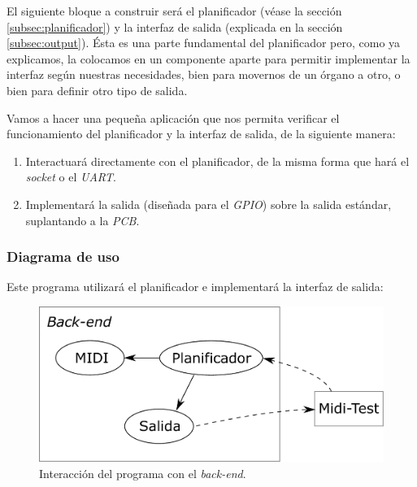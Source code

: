 El siguiente bloque a construir será el planificador (véase la sección \ref{subsec:planificador}) y la interfaz de salida (explicada en la sección \ref{subsec:output}). Ésta es una parte fundamental del planificador pero, como ya explicamos, la colocamos en un componente aparte para permitir implementar la interfaz según nuestras necesidades, bien para movernos de un órgano a otro, o bien para definir otro tipo de salida.

Vamos a hacer una pequeña aplicación que nos permita verificar el funcionamiento del planificador y la interfaz de salida, de la siguiente manera:

\begin{enumerate}
	\item Interactuará directamente con el planificador, de la misma forma que hará el \textit{socket} o el \textit{UART}.
	\item Implementará la salida (diseñada para el \textit{GPIO}) sobre la salida estándar, suplantando a la \textit{PCB}.
\end{enumerate}

\subsubsection{Diagrama de uso}

Este programa utilizará el planificador e implementará la interfaz de salida:

\smallskip

\begin{figure}[H]
	\noindent \begin{centering}
		\includegraphics[width=\linewidth/2]{capitulo4/midi_test}
		\par\end{centering}
	\smallskip
	\caption{\label{fig:midi_test} Interacción del programa con el \textit{back-end}.}
\end{figure} 

